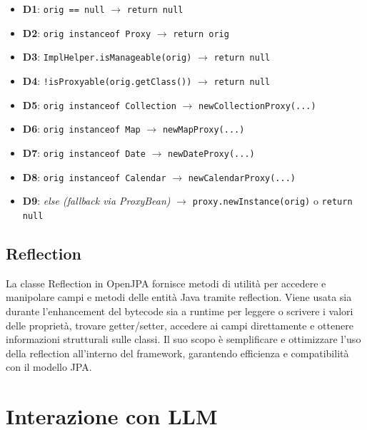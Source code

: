 \documentclass[10pt]{article}
\begin{document}
{\begin{itemize}[label=--, itemsep=2pt, parsep=0pt]
			\item \textbf{D1}: \texttt{orig == null} $\rightarrow$ \texttt{return null}
			\item \textbf{D2}: \texttt{orig instanceof Proxy} $\rightarrow$ \texttt{return orig}
			\item \textbf{D3}: \texttt{ImplHelper.isManageable(orig)} $\rightarrow$ \texttt{return null}
			\item \textbf{D4}: \texttt{!isProxyable(orig.getClass())} $\rightarrow$ \texttt{return null}
			\item \textbf{D5}: \texttt{orig instanceof Collection} $\rightarrow$ \texttt{newCollectionProxy(...)}
			\item \textbf{D6}: \texttt{orig instanceof Map} $\rightarrow$ \texttt{newMapProxy(...)}
			\item \textbf{D7}: \texttt{orig instanceof Date} $\rightarrow$ \texttt{newDateProxy(...)}
			\item \textbf{D8}: \texttt{orig instanceof Calendar} $\rightarrow$ \texttt{newCalendarProxy(...)}
			\item \textbf{D9}: \textit{else (fallback via ProxyBean)} $\rightarrow$ \texttt{proxy.newInstance(orig)} o \texttt{return null}
		\end{itemize}
		
		
		
		\subsection{Reflection}
		La classe Reflection in OpenJPA fornisce metodi di utilità per accedere e manipolare campi e metodi delle entità Java tramite reflection. Viene usata sia durante l’enhancement del bytecode sia a runtime per leggere o scrivere i valori delle proprietà, trovare getter/setter, accedere ai campi direttamente e ottenere informazioni strutturali sulle classi. Il suo scopo è semplificare e ottimizzare l’uso della reflection all’interno del framework, garantendo efficienza e compatibilità con il modello JPA.
		\fontsize{8}{8}
		\section{Interazione con LLM}
		
}
\end{document}

